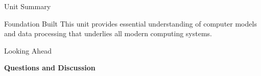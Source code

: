 \documentclass[aspectratio=169]{beamer}
\begin{document}
\begin{frame}{Unit Summary}
    \vspace{0.5cm}
    \begin{block}{Foundation Built}
        This unit provides essential understanding of computer models and data processing that underlies all modern computing systems.
    \end{block}
\end{frame}

\begin{frame}{Looking Ahead}
    
    
    
    \vspace{0.5cm}
    \begin{center}
        \textbf{Questions and Discussion}
    \end{center}
\end{frame}
\end{document}
